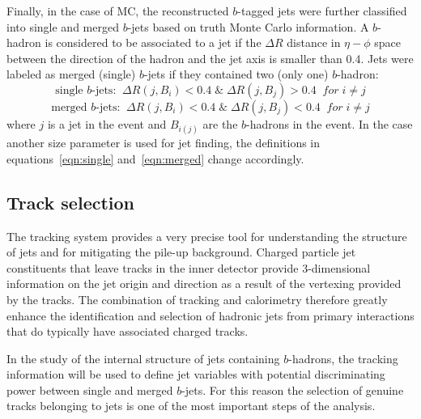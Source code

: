 Finally, in the case of MC, the reconstructed $b$-tagged jets were further classified into single and merged $b$-jets based on truth Monte Carlo information. A $b$-hadron is considered to be associated to a jet if the $\Delta R$ distance in $\eta-\phi$ space between the direction of the hadron and the jet axis is smaller than 0.4. Jets were labeled as merged (single) $b$-jets if they contained two (only one) $b$-hadron:%
\begin{equation}
\mbox{single $b$-jets:} \; \; \Delta R(j,B_i) < 0.4 \; \& \;  \Delta R(j,B_j) > 0.4 \; \; for \; i \neq j
\label{eqn:single}
\end{equation}
\begin{equation}
\mbox{merged $b$-jets:}  \; \; \Delta R(j,B_i) < 0.4 \; \& \;  \Delta R(j,B_j) < 0.4 \; \; for \; i \neq j
\label{eqn:merged}
\end{equation}
%
where $j$ is a jet in the event and $B_{i(j)}$ are the $b$-hadrons in the event. In the case another size parameter is used for jet finding, the definitions in equations~\ref{eqn:single} and~\ref{eqn:merged} change accordingly.


\subsection{Track selection}\label{sec:trackselection}
The tracking system provides a very precise tool for understanding the structure of jets and for mitigating the pile-up background.  Charged particle jet constituents that leave tracks in the inner detector provide 3-dimensional information on the jet origin and direction as a result of the vertexing provided by the tracks. The combination of tracking and calorimetry therefore greatly enhance the identification and selection of hadronic jets from primary interactions that do typically have associated charged tracks. 

In the study of the internal structure of jets containing $b$-hadrons, the tracking information will be used to define jet variables with potential discriminating power between single and merged $b$-jets.  For this reason the selection of genuine tracks belonging to jets is one of the most important steps of the analysis.

